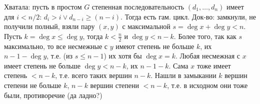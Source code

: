 Хватала: пусть в простом $G$ степенная последовательность $(d_1, \dots, d_n)$ имеет для $i<n/2$:
$d_i>i\lor d_{n-i}\ge(n-i)$.
Тогда есть гам. цикл.
Док-во: замкнули, не получили полный, взяли пару $(x, y)$ с максимальной $s=\deg x + \deg y < n$.
Пусть $k=\deg x \le \deg y$, тогда $k < \frac{n}{2}$ и $\deg y < n-k$.
Более того, так как $s$ максимально, то все несмежные с $y$ имеют степень не больше $k$,
их $n-1-\deg y$, т.е. (из $s \le n-1$) их хотя бы $\deg x = k$.
Любая несмежная с $x$ имеет степень не больше $\deg y < n-k$,
их $n-1-k$.
Сама $x$ тоже имеет степень $< n-k$, т.е. всего таких вершин $n-k$.
Нашли в замыкании $k$ вершин степени не больше $k$, $n-k$ вершин степени $<n-k$,
т.е. в исходном они тоже были, противоречие (\TODO да ладно?)

\section{} %

\section{} %
